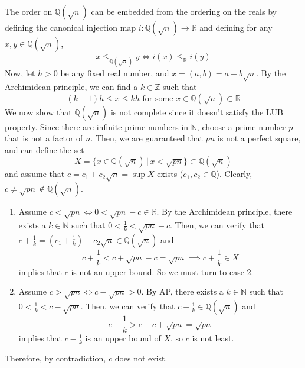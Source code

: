 \documentclass{article}
\begin{document}
    \begin{solution}
    The order on $\mathbb{Q}(\sqrt{n})$ can be embedded from the ordering on the reals by defining the canonical injection map $i:\mathbb{Q}(\sqrt{n}) \longrightarrow \mathbb{R}$ and defining for any $x, y \in \mathbb{Q}(\sqrt{n})$, 
    \[x \leq_{\mathbb{Q}(\sqrt{n})} y \iff i(x) \leq_{\mathbb{R}} i(y)\]
    Now, let $h > 0$ be any fixed real number, and $x = (a,b) = a + b\sqrt{n}$. By the Archimidean principle, we can find a $k \in \mathbb{Z}$ such that
    \[(k - 1) h \leq x \leq k h \text{ for some } x \in \mathbb{Q}(\sqrt{n}) \subset \mathbb{R}\]
    We now show that $\mathbb{Q}(\sqrt{n})$ is not complete since it doesn't satisfy the LUB property. Since there are infinite prime numbers in $\mathbb{N}$, choose a prime number $p$ that is not a factor of $n$. Then, we are guaranteed that $pn$ is not a perfect square, and can define the set 
    \[X = \{x \in \mathbb{Q}(\sqrt{n})\,|\, x < \sqrt{pn} \} \subset \mathbb{Q}(\sqrt{n})\]
    and assume that $c = c_1 + c_2 \sqrt{n} = \sup{X}$ exists ($c_1, c_2 \in \mathbb{Q}$). Clearly, $c \neq \sqrt{pn} \not\in \mathbb{Q}(\sqrt{n})$. 
    \begin{enumerate}
        \item Assume $c < \sqrt{pn} \iff 0 < \sqrt{pn} - c \in \mathbb{R}$. By the Archimidean principle, there exists a $k \in \mathbb{N}$ such that $0 < \frac{1}{k} < \sqrt{pn} - c $. Then, we can verify that $c + \frac{1}{k} = (c_1 + \frac{1}{k}) + c_2 \sqrt{n} \in \mathbb{Q}(\sqrt{n})$ and 
        \[c + \frac{1}{k} < c + \sqrt{pn} - c = \sqrt{pn} \implies c + \frac{1}{k} \in X\]
        implies that $c$ is not an upper bound. So we must turn to case 2. 
        \item Assume $c > \sqrt{pn} \iff c - \sqrt{pn} > 0$. By AP, there exists a $k \in \mathbb{N}$ such that $0 < \frac{1}{k} < c - \sqrt{pn}$. Then, we can verify that $c - \frac{1}{k} \in \mathbb{Q}(\sqrt{n})$ and 
        \[c - \frac{1}{k} > c - c + \sqrt{pn} = \sqrt{pn}\]
        implies that $c - \frac{1}{k}$ is an upper bound of $X$, so $c$ is not least. 
    \end{enumerate}
    Therefore, by contradiction, $c$ does not exist. 
    \end{solution}
\end{document}
